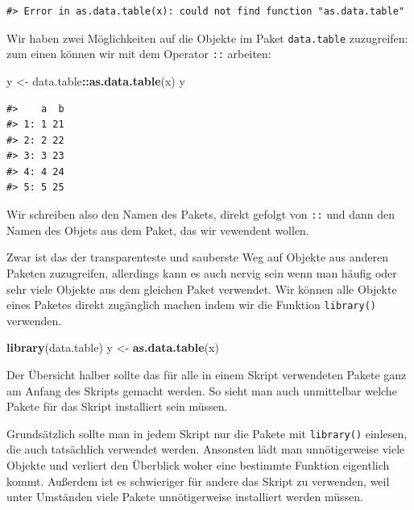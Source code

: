 \documentclass[]{book}
\newenvironment{Shaded}{\begin{snugshade}}{\end{snugshade}}
\newcommand{\KeywordTok}[1]{\textcolor[rgb]{0.13,0.29,0.53}{\textbf{#1}}}
\newcommand{\StringTok}[1]{\textcolor[rgb]{0.31,0.60,0.02}{#1}}
\newcommand{\OperatorTok}[1]{\textcolor[rgb]{0.81,0.36,0.00}{\textbf{#1}}}
\newcommand{\NormalTok}[1]{#1}
\begin{document}
\begin{verbatim}
#> Error in as.data.table(x): could not find function "as.data.table"
\end{verbatim}

Wir haben zwei Möglichkeiten auf die Objekte im Paket
\texttt{data.table} zuzugreifen: zum einen können wir mit dem Operator
\texttt{::} arbeiten:

\begin{Shaded}
\begin{Highlighting}[]
\NormalTok{y <-}\StringTok{ }\NormalTok{data.table}\OperatorTok{::}\KeywordTok{as.data.table}\NormalTok{(x)}
\NormalTok{y}
\end{Highlighting}
\end{Shaded}

\begin{verbatim}
#>    a  b
#> 1: 1 21
#> 2: 2 22
#> 3: 3 23
#> 4: 4 24
#> 5: 5 25
\end{verbatim}

Wir schreiben also den Namen des Pakets, direkt gefolgt von \texttt{::}
und dann den Namen des Objets aus dem Paket, das wir vewendent wollen.

Zwar ist das der transparenteste und sauberste Weg auf Objekte aus
anderen Paketen zuzugreifen, allerdings kann es auch nervig sein wenn
man häufig oder sehr viele Objekte aus dem gleichen Paket verwendet. Wir
können alle Objekte eines Paketes direkt zugänglich machen indem wir die
Funktion \texttt{library()} verwenden.

\begin{Shaded}
\begin{Highlighting}[]
\KeywordTok{library}\NormalTok{(data.table)}
\NormalTok{y <-}\StringTok{ }\KeywordTok{as.data.table}\NormalTok{(x)}
\end{Highlighting}
\end{Shaded}

Der Übersicht halber sollte das für alle in einem Skript verwendeten
Pakete ganz am Anfang des Skripts gemacht werden. So sieht man auch
unmittelbar welche Pakete für das Skript installiert sein müssen.

Grundsätzlich sollte man in jedem Skript nur die Pakete mit
\texttt{library()} einlesen, die auch tatsächlich verwendet werden.
Ansonsten lädt man unnötigerweise viele Objekte und verliert den
Überblick woher eine bestimmte Funktion eigentlich kommt. Außerdem ist
es schwieriger für andere das Skript zu verwenden, weil unter Umständen
viele Pakete unnötigerweise installiert werden müssen.
\end{document}

